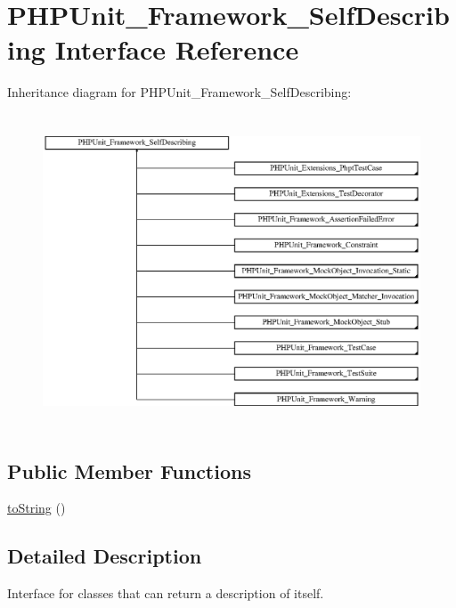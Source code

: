 \hypertarget{interface_p_h_p_unit___framework___self_describing}{}\section{P\+H\+P\+Unit\+\_\+\+Framework\+\_\+\+Self\+Describing Interface Reference}
\label{interface_p_h_p_unit___framework___self_describing}
Inheritance diagram for P\+H\+P\+Unit\+\_\+\+Framework\+\_\+\+Self\+Describing\+:\begin{figure}[H]
\begin{center}
\leavevmode
\includegraphics[height=9.333334cm]{interface_p_h_p_unit___framework___self_describing}
\end{center}
\end{figure}
\subsection*{Public Member Functions}
\begin{DoxyCompactItemize}
\item 
\mbox{\hyperlink{interface_p_h_p_unit___framework___self_describing_a5558c5d549f41597377fa1ea8a1cefa3}{to\+String}} ()
\end{DoxyCompactItemize}


\subsection{Detailed Description}
Interface for classes that can return a description of itself. 

